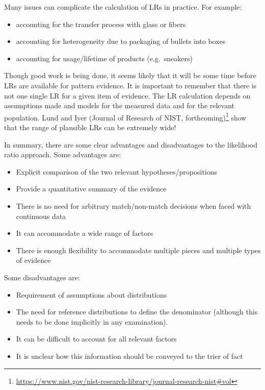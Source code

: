 \documentclass[]{book}
\providecommand{\tightlist}{%
  \setlength{\itemsep}{0pt}\setlength{\parskip}{0pt}}
\let\rmarkdownfootnote\footnote%
\def\footnote{\protect\rmarkdownfootnote}
\theoremstyle{definition}
\theoremstyle{definition}
\theoremstyle{remark}
\begin{document}
Many issues can complicate the calculation of LRs in practice. For
example:

\begin{itemize}
\tightlist
\item
  accounting for the transfer process with glass or fibers
\item
  accounting for heterogeneity due to packaging of bullets into boxes
\item
  accounting for usage/lifetime of products (e.g.~sneakers)
\end{itemize}

Though good work is being done, it seems likely that it will be some
time before LRs are available for pattern evidence. It is important to
remember that there is not one single LR for a given item of evidence.
The LR calculation depends on assumptions made and models for the
measured data and for the relevant population. Lund and Iyer (Journal of
Research of NIST, forthcoming)\footnote{\url{https://www.nist.gov/nist-research-library/journal-research-nist\#vol}}
show that the range of plausible LRs can be extremely wide!

In summary, there are some clear advantages and disadvantages to the
likelihood ratio approach. Some advantages are:

\begin{itemize}
\tightlist
\item
  Explicit comparison of the two relevant hypotheses/propositions
\item
  Provide a quantitative summary of the evidence
\item
  There is no need for arbitrary match/non-match decisions when faced
  with continuous data
\item
  It can accommodate a wide range of factors
\item
  There is enough flexibility to accommodate multiple pieces and
  multiple types of evidence
\end{itemize}

Some disadvantages are:

\begin{itemize}
\tightlist
\item
  Requirement of assumptions about distributions
\item
  The need for reference distributions to define the denominator
  (although this needs to be done implicitly in any examination).
\item
  It can be difficult to account for all relevant factors
\item
  It is unclear how this information should be conveyed to the trier of
  fact
\end{itemize}
\end{document}
